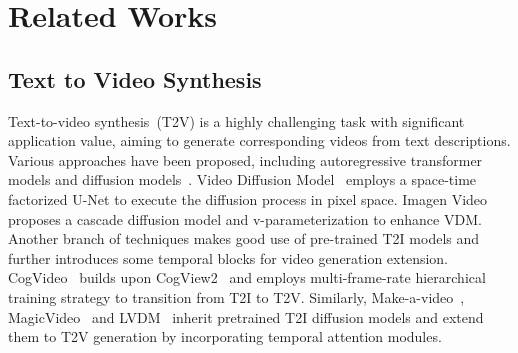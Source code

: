\section{Related Works}
\label{sec:realtedworks}

\subsection{Text to Video Synthesis}
Text-to-video synthesis~(T2V) is a highly challenging task with significant application value, aiming to generate corresponding videos from text descriptions. Various approaches have been proposed, including autoregressive transformer~\cite{vaswani2017attention} models and diffusion models~\cite{DDPM, DDIM, nichol2021improved, song2020score}. 
Video Diffusion Model~\cite{ho2022video} employs a space-time factorized U-Net to execute the diffusion process in pixel space. Imagen Video~\cite{ho2022imagen} proposes a cascade diffusion model and v-parameterization to enhance VDM. 
Another branch of techniques makes good use of pre-trained T2I models and further introduces some temporal blocks for video generation extension. CogVideo~\cite{hong2022cogvideo} builds upon CogView2~\cite{ding2022cogview2} and employs multi-frame-rate hierarchical training strategy to transition from T2I to T2V. Similarly,  Make-a-video~\cite{make-a-video}, MagicVideo~\cite{zhou2022magicvideo} and LVDM~\cite{he2022latent} inherit pretrained T2I diffusion models and extend them to T2V generation by incorporating temporal attention modules.

